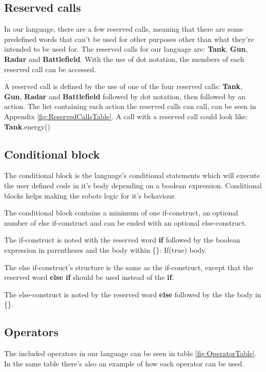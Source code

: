 \subsection{Reserved calls}
In our language, there are a few reserved calls, meaning that there are some predefined words that can’t be used for other purposes other than what they’re intended to be used for. The reserved calls for our language are: \textbf{Tank}, \textbf{Gun}, \textbf{Radar} and \textbf{Battlefield}. With the use of dot notation, the members of each reserved call can be accessed.  

\begin{defi}
A reserved call is defined by the use of one of the four reserved calls: \textbf{Tank}, \textbf{Gun}, \textbf{Radar} and \textbf{Battlefield} followed by dot notation, then followed by an action. The list containing each action the reserved calls can call, can be seen in Appendix \ref{fig:ReservedCallsTable}. \newline
A call with a reserved call could look like: \textbf{Tank}.energy()
\end{defi}

\subsection{Conditional block}
The conditional block is the language's conditional statements which will execute the user defined code in it's body depending on a boolean expression. Conditional blocks helps making the robots logic for it's behaviour. 

\begin{defi}
The conditional block contains a minimum of one if-construct, an optional number of else if-construct and can be ended with an optional else-construct. 

The if-construct is noted with the reserved word \textbf{if} followed by the boolean expression in parentheses and the body within \{\}: If(true) {body}.

The else if-construct's structure is the same as the if-construct, except that the reserved  word \textbf{else if} should be used instead of the \textbf{if}. 

The else-construct is noted by the reserved word \textbf{else} followed by the the body in \{\}.
\end{defi}

\subsection{Operators}
The included operators in our language can be seen in table \ref{fig:OperatorTable}. In the same table there's also an example of how each operator can be used.

